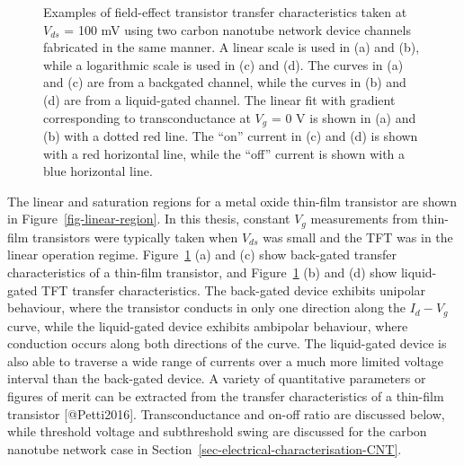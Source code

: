 \documentclass[
  letterpaper,
  DIV=11,
  numbers=noendperiod]{scrartcl}
\begin{document}
\begin{figure}
\caption{\label{fig-gating-transfer}Examples of field-effect transistor
transfer characteristics taken at \(V_{ds}\) = 100 mV using two carbon
nanotube network device channels fabricated in the same manner. A linear
scale is used in (a) and (b), while a logarithmic scale is used in (c)
and (d). The curves in (a) and (c) are from a backgated channel, while
the curves in (b) and (d) are from a liquid-gated channel. The linear
fit with gradient corresponding to transconductance at \(V_g\) = 0 V is
shown in (a) and (b) with a dotted red line. The ``on'' current in (c)
and (d) is shown with a red horizontal line, while the ``off'' current
is shown with a blue horizontal line.}

\end{figure}%

The linear and saturation regions for a metal oxide thin-film transistor
are shown in Figure~\ref{fig-linear-region}. In this thesis, constant
\(V_g\) measurements from thin-film transistors were typically taken
when \(V_{ds}\) was small and the TFT was in the linear operation
regime. Figure~\ref{fig-gating-transfer} (a) and (c) show back-gated
transfer characteristics of a thin-film transistor, and
Figure~\ref{fig-gating-transfer} (b) and (d) show liquid-gated TFT
transfer characteristics. The back-gated device exhibits unipolar
behaviour, where the transistor conducts in only one direction along the
\(I_d - V_g\) curve, while the liquid-gated device exhibits ambipolar
behaviour, where conduction occurs along both directions of the curve.
The liquid-gated device is also able to traverse a wide range of
currents over a much more limited voltage interval than the back-gated
device. A variety of quantitative parameters or figures of merit can be
extracted from the transfer characteristics of a thin-film transistor
{[}@Petti2016{]}. Transconductance and on-off ratio are discussed below,
while threshold voltage and subthreshold swing are discussed for the
carbon nanotube network case in
Section~\ref{sec-electrical-characterisation-CNT}.
\end{document}
